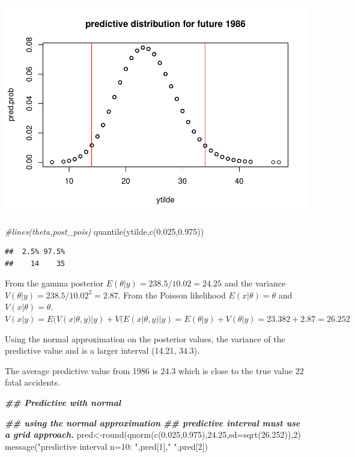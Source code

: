 \documentclass[
]{book}
\newenvironment{Shaded}{\begin{snugshade}}{\end{snugshade}}
\newcommand{\AttributeTok}[1]{\textcolor[rgb]{0.77,0.63,0.00}{#1}}
\newcommand{\CommentTok}[1]{\textcolor[rgb]{0.56,0.35,0.01}{\textit{#1}}}
\newcommand{\DecValTok}[1]{\textcolor[rgb]{0.00,0.00,0.81}{#1}}
\newcommand{\DocumentationTok}[1]{\textcolor[rgb]{0.56,0.35,0.01}{\textbf{\textit{#1}}}}
\newcommand{\FloatTok}[1]{\textcolor[rgb]{0.00,0.00,0.81}{#1}}
\newcommand{\FunctionTok}[1]{\textcolor[rgb]{0.00,0.00,0.00}{#1}}
\newcommand{\NormalTok}[1]{#1}
\newcommand{\OtherTok}[1]{\textcolor[rgb]{0.56,0.35,0.01}{#1}}
\newcommand{\StringTok}[1]{\textcolor[rgb]{0.31,0.60,0.02}{#1}}
\theoremstyle{definition}
\theoremstyle{definition}
\theoremstyle{definition}
\theoremstyle{definition}
\theoremstyle{remark}
\begin{document}
\includegraphics{_main_files/figure-latex/unnamed-chunk-23-2.pdf}

\begin{Shaded}
\begin{Highlighting}[]
 \CommentTok{\#lines(theta,post\_pois)}
 \FunctionTok{quantile}\NormalTok{(ytilde,}\FunctionTok{c}\NormalTok{(}\FloatTok{0.025}\NormalTok{,}\FloatTok{0.975}\NormalTok{))}
\end{Highlighting}
\end{Shaded}

\begin{verbatim}
##  2.5% 97.5% 
##    14    35
\end{verbatim}

From the gamma posterior \(E(\theta | y) = 238.5/10.02=24.25\) and the variance \(V(\theta|y)= 238.5/10.02^2=2.87\). From the Poisson likelihood \(E(x|\theta)=\theta\) and \(V(x|\theta)=\theta\). \(V(x|y)= E(V(x|\theta,y) | y) + V(E(x|\theta,y)|y)= E(\theta| y)+ V(\theta|y) = 23.382+2.87= 26.252\)

Using the normal approximation on the posterior values, the variance of the predictive value and is a larger interval (14.21, 34.3).

The average predictive value from 1986 is 24.3 which is close to the true value 22 fatal accidents.

\begin{Shaded}
\begin{Highlighting}[]
  \DocumentationTok{\#\# Predictive with normal}

\DocumentationTok{\#\# using the normal approximation}
\DocumentationTok{\#\# predictive interval must use a grid approach.}
\NormalTok{     pred}\OtherTok{\textless{}{-}}\FunctionTok{round}\NormalTok{(}\FunctionTok{qnorm}\NormalTok{(}\FunctionTok{c}\NormalTok{(}\FloatTok{0.025}\NormalTok{,}\FloatTok{0.975}\NormalTok{),}\FloatTok{24.25}\NormalTok{,}\AttributeTok{sd=}\FunctionTok{sqrt}\NormalTok{(}\FloatTok{26.252}\NormalTok{)),}\DecValTok{2}\NormalTok{)}
  \FunctionTok{message}\NormalTok{(}\StringTok{"predictive interval n=10: "}\NormalTok{,pred[}\DecValTok{1}\NormalTok{],}\StringTok{" "}\NormalTok{,pred[}\DecValTok{2}\NormalTok{])}
\end{Highlighting}
\end{Shaded}
\end{document}
